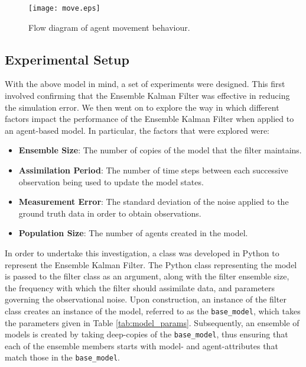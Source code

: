 \begin{figure}[!htb]
    \centering
    \texttt{[image: move.eps]}
    \caption{Flow diagram of agent movement behaviour.}\label{fig:move}
\end{figure}

\subsection{Experimental Setup}\label{sub:research:experiments}

With the above model in mind, a set of experiments were designed.
This first involved confirming that the Ensemble Kalman Filter was effective in
reducing the simulation error.
We then went on to explore the way in which different factors impact the
performance of the Ensemble Kalman Filter when applied to an agent-based model.
In particular, the factors that were explored were:
\begin{itemize}
    \item \textbf{Ensemble Size}: The number of copies of the model that the
        filter maintains.
    \item \textbf{Assimilation Period}: The number of time steps between each
        successive observation being used to update the model states.
    \item \textbf{Measurement Error}: The standard deviation of the noise
        applied to the ground truth data in order to obtain observations.
    \item \textbf{Population Size}: The number of agents created in the model.
\end{itemize}

In order to undertake this investigation, a class was developed in Python to
represent the Ensemble Kalman Filter.
The Python class representing the model is passed to the filter class as an
argument, along with the filter ensemble size, the frequency with which the
filter should assimilate data, and parameters governing the observational noise.
Upon construction, an instance of the filter class creates an instance of the
model, referred to as the \texttt{base\_model}, which takes the parameters given
in Table \ref{tab:model_params}.
Subsequently, an ensemble of models is created by taking deep-copies of the
\texttt{base\_model}, thus ensuring that each of the ensemble members starts
with model- and agent-attributes that match those in the \texttt{base\_model}.

